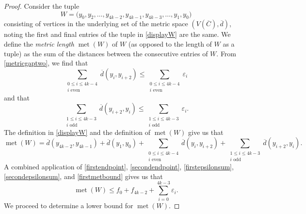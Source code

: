 \documentclass[10pt,a4paper]{amsart}
\begin{document}
\begin{proof}
 Consider the tuple 
\begin{equation}\label{displayW}
 W = \big( y_0, y_2, \ldots, y_{4k-2}, y_{4k-1}, y_{4k-3}, \ldots, y_{1}, y_{0} \big) 
\end{equation}
 consisting of vertices in the underlying set of the metric space $(V(\overline{C}), \overline{d})$, noting the first and final entries of the 
 tuple in \eqref{displayW} are the same. 
 We define the \emph{metric length} $\operatorname{met}(W)$ of $W$ (as opposed to the length of $W$ as a tuple) 
 as the sum of the distances between the consecutive entries of $W$. 
 From \eqref{metricgaptwo}, we find that 
\begin{equation}\label{firstepsilonsum} 
 \sum_{\substack{ 0\leq i \leq 4k-4 \\ \text{$i$ even} }} \overline{d}(y_i, y_{i+2}) 
 \leq \sum_{\substack{0\leq i \leq 4k-4 \\ \text{$i$ even}}} \varepsilon_i 
\end{equation}
 and that 
\begin{equation}\label{secondepsilonsum} 
 \sum_{\substack{ 1 \leq i \leq 4 k - 3 \\ \text{$i$ odd} }} \overline{d}(y_{i+2}, y_{i}) 
 \leq \sum_{\substack{ 1 \leq i \leq 4 k - 3 \\ \text{$i$ odd}}} \varepsilon_{i}. 
\end{equation}
 The definition in \eqref{displayW} and the definition of $\operatorname{met}(W)$ give us that 
\begin{equation}\label{firstmetbound} 
 \operatorname{met}(W) = 
 \overline{d}(y_{4k-2}, y_{4k-1}) 
 + \overline{d}(y_{1}, y_{0}) 
 + \sum_{\substack{ 0\leq i \leq 4k-4 \\ \text{$i$ even} }} \overline{d}(y_i, y_{i+2}) + \sum_{\substack{ 1 \leq i \leq 4 k - 3 \\ \text{$i$ odd} }} \overline{d}(y_{i+2}, y_{i}). 
\end{equation}
 A combined application of \eqref{firstendpoint}, 
 \eqref{secondendpoint}, \eqref{firstepsilonsum}, 
 \eqref{secondepsilonsum}, and \eqref{firstmetbound} gives us that 
\begin{equation}\label{metWabove}
 \operatorname{met}(W) \leq f_0 + f_{4k-2} + \sum_{i=0}^{4k-3} \varepsilon_i.
\end{equation}
 We proceed to determine a lower bound for $\operatorname{met}(W)$. 


\end{proof}
\end{document}
